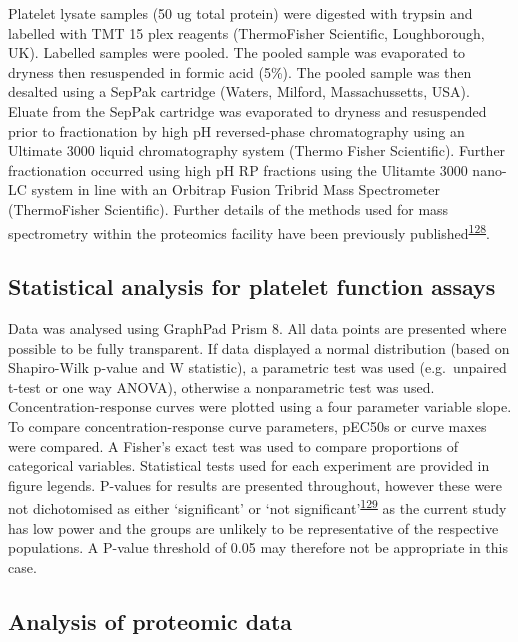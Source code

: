 \documentclass[11pt,twoside]{bristolthesis}
\begin{document}
Platelet lysate samples (50 ug total protein) were digested with trypsin and labelled with TMT 15 plex reagents (ThermoFisher Scientific, Loughborough, UK). Labelled samples were pooled. The pooled sample was evaporated to dryness then resuspended in formic acid (5\%). The pooled sample was then desalted using a SepPak cartridge (Waters, Milford, Massachussetts, USA). Eluate from the SepPak cartridge was evaporated to dryness and resuspended prior to fractionation by high pH reversed-phase chromatography using an Ultimate 3000 liquid chromatography system (Thermo Fisher Scientific). Further fractionation occurred using high pH RP fractions using the Ulitamte 3000 nano-LC system in line with an Orbitrap Fusion Tribrid Mass Spectrometer (ThermoFisher Scientific). Further details of the methods used for mass spectrometry within the proteomics facility have been previously published\textsuperscript{\protect\hyperlink{ref-Durrant2020}{128}}.

\hypertarget{statistical-analysis-for-platelet-function-assays}{%
\subsection{Statistical analysis for platelet function assays}\label{statistical-analysis-for-platelet-function-assays}}

Data was analysed using GraphPad Prism 8. All data points are presented where possible to be fully transparent. If data displayed a normal distribution (based on Shapiro-Wilk p-value and W statistic), a parametric test was used (e.g.~unpaired t-test or one way ANOVA), otherwise a nonparametric test was used. Concentration-response curves were plotted using a four parameter variable slope. To compare concentration-response curve parameters, pEC50s or curve maxes were compared. A Fisher's exact test was used to compare proportions of categorical variables. Statistical tests used for each experiment are provided in figure legends. P-values for results are presented throughout, however these were not dichotomised as either `significant' or `not significant'\textsuperscript{\protect\hyperlink{ref-Sterne2001}{129}} as the current study has low power and the groups are unlikely to be representative of the respective populations. A P-value threshold of 0.05 may therefore not be appropriate in this case.

\hypertarget{analysis-of-proteomic-data}{%
\subsection{Analysis of proteomic data}\label{analysis-of-proteomic-data}}
\end{document}
